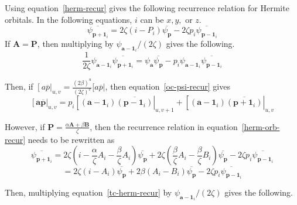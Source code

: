 \documentclass{article}
\begin{document}
Using equation~\ref{herm-recur} gives the following recurrence relation for Hermite orbitals. In the following equations, $i$ can be $x, y,$ or $z$.
\begin{equation}
  \overline{\psi_{\mathbf{p} + \mathbf{1}_i}} = 2\zeta\left(i - P_i\right)\overline{\psi_{\mathbf{p}}} - 2\zeta p_i\overline{\psi_{\mathbf{p} - \mathbf{1}_i}}
  \label{herm-orb-recur}
\end{equation}
If $\mathbf{A} = \mathbf{P}$, then multiplying by $\psi_{\mathbf{a} - \mathbf{1}_i} / (2\zeta)$ gives the following.
\begin{equation}
  \frac{1}{2\zeta} \psi_{\mathbf{a} - \mathbf{1}_i} \overline{\psi_{\mathbf{p} + \mathbf{1}_i}} = \psi_{\mathbf{a}}\overline{\psi_{\mathbf{p}}} - p_i \psi_{\mathbf{a} - \mathbf{1}_i}\overline{\psi_{\mathbf{p} - \mathbf{1}_i}}
  \label{oc-psi-recur}
\end{equation}

Then, if $\left[a\overline{p}\right|_{u,v} = \frac{(2\beta)^u}{(2\zeta)^v}[a\overline{p}|$, then equation~\ref{oc-psi-recur} gives
\begin{equation}
  \left[\mathbf{a}\overline{\mathbf{p}}\right|_{u,v} = p_i\left[\left(\mathbf{a} - \mathbf{1}_i\right)\overline{\left(\mathbf{p} - \mathbf{1}_i\right)}\right|_{u,v+1} + \left[\left(\mathbf{a} - \mathbf{1}_i\right)\overline{\left(\mathbf{p} + \mathbf{1}_i\right)}\right|_{u,v}
  \label{oc-recur}
\end{equation}

However, if $\mathbf{P} = \frac{\alpha \mathbf{A} + \beta\mathbf{B}}{\zeta}$, then the recurrence relation in equation~\ref{herm-orb-recur} needs to be rewritten as
$$\overline{\psi_{\mathbf{p} + \mathbf{1}_i}} = 2\zeta\left(i - \frac{\alpha}{\zeta}A_i - \frac{\beta}{\zeta}A_i\right)\overline{\psi_{\mathbf{p}}} + 2\zeta\left(\frac{\beta}{\zeta}A_i - \frac{\beta}{\zeta}B_i\right)\overline{\psi_{\mathbf{p}}} - 2\zeta p_i\overline{\psi_{\mathbf{p} - \mathbf{1}_i}}$$
\begin{equation}
  = 2\zeta\left(i - A_i\right)\overline{\psi_{\mathbf{p}}} + 2\beta\left(A_i - B_i\right)\overline{\psi_{\mathbf{p}}} - 2\zeta p_i\overline{\psi_{\mathbf{p} - \mathbf{1}_i}}
  \label{tc-herm-recur}
\end{equation}

Then, multiplying equation~\ref{tc-herm-recur} by $\psi_{\mathbf{a} - \mathbf{1}_i} / (2\zeta)$ gives the following.
\end{document}

